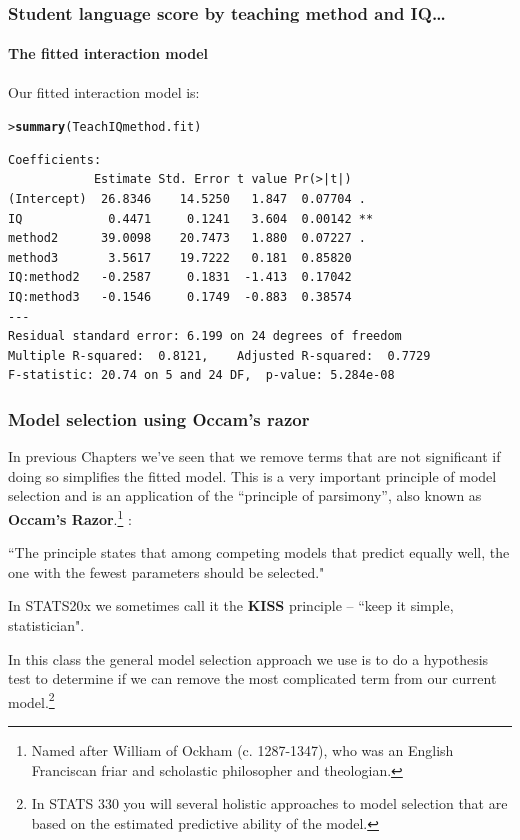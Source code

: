 \documentclass{beamer}\usepackage[]{graphicx}\usepackage[]{xcolor}
\makeatletter
\newcommand{\hlstd}[1]{\textcolor[rgb]{0.345,0.345,0.345}{#1}}%
\newcommand{\hlkwd}[1]{\textcolor[rgb]{0.737,0.353,0.396}{\textbf{#1}}}%
\newenvironment{kframe}{%
 \def\at@end@of@kframe{}%
 \ifinner\ifhmode%
  \def\at@end@of@kframe{\end{minipage}}%
  \begin{minipage}{\columnwidth}%
 \fi\fi%
 \def\FrameCommand##1{\hskip\@totalleftmargin \hskip-\fboxsep
 \colorbox{shadecolor}{##1}\hskip-\fboxsep
     \hskip-\linewidth \hskip-\@totalleftmargin \hskip\columnwidth}%
 \MakeFramed {\advance\hsize-\width
   \@totalleftmargin\z@ \linewidth\hsize
   \@setminipage}}%
 {\par\unskip\endMakeFramed%
 \at@end@of@kframe}
\newenvironment{knitrout}{}{} %
\makeatother
\begin{document}
\begin{frame}[fragile]
\frametitle{Student language score by  teaching method and IQ\ldots}
\framesubtitle{The fitted interaction model}
Our fitted interaction model is:
\bigskip

\begin{knitrout}\scriptsize
{}\color{fgcolor}\begin{kframe}
\begin{alltt}
\hlstd{> }\hlkwd{summary}\hlstd{(TeachIQmethod.fit)}
\end{alltt}
\end{kframe}
\end{knitrout}

\begin{knitrout}\scriptsize
{}\color{fgcolor}\begin{kframe}
\begin{verbatim}
Coefficients:
            Estimate Std. Error t value Pr(>|t|)   
(Intercept)  26.8346    14.5250   1.847  0.07704 . 
IQ            0.4471     0.1241   3.604  0.00142 **
method2      39.0098    20.7473   1.880  0.07227 . 
method3       3.5617    19.7222   0.181  0.85820   
IQ:method2   -0.2587     0.1831  -1.413  0.17042   
IQ:method3   -0.1546     0.1749  -0.883  0.38574   
---
Residual standard error: 6.199 on 24 degrees of freedom
Multiple R-squared:  0.8121,	Adjusted R-squared:  0.7729 
F-statistic: 20.74 on 5 and 24 DF,  p-value: 5.284e-08
\end{verbatim}
\end{kframe}
\end{knitrout}
\vfill
\end{frame}



\begin{frame}[fragile]
\frametitle{Model selection using Occam's razor}
In previous Chapters we've seen that we remove terms that are not significant if doing so simplifies the fitted model. This is a very important principle of model selection and is an application of the ``principle of parsimony'', also known as \textbf{Occam's Razor}.\footnote{Named after William of Ockham (c. 1287-1347), who was an English Franciscan friar and scholastic philosopher and theologian.} :
\medskip

``The principle states that among competing models that predict equally well, the one with the fewest parameters should be selected."
\medskip

In STATS20x we sometimes call it the \textbf{KISS} principle -- ``keep it simple, statistician".
\bigskip

In this class the general model selection approach we use is to do a hypothesis test to determine if we can remove the most complicated term from our current model.\footnote{In STATS 330 you will several holistic approaches to model selection that are based on the estimated predictive ability of the model.}
\end{frame}
\end{document}
